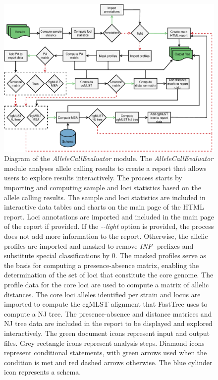 \newpage
\begin{figure}[!ht]
    \centering
    \includegraphics[angle=0,width=\textwidth]{figures/chapter 2/FigureS22.pdf}
    \caption[Diagram of the \textit{AlleleCallEvaluator} module.]{Diagram of the \textit{AlleleCallEvaluator} module. The \textit{AlleleCallEvaluator} module analyses allele calling results to create a report that allows users to explore results interactively. The process starts by importing and computing sample and loci statistics based on the allele calling results. The sample and loci statistics are included in interactive data tables and charts on the main page of the \ac{HTML} report. Loci annotations are imported and included in the main page of the report if provided. If the \textit{-{}-light} option is provided, the process does not add more information to the report. Otherwise, the allelic profiles are imported and masked to remove \textit{INF-} prefixes and substitute special classifications by 0. The masked profiles serve as the basis for computing a presence-absence matrix, enabling the determination of the set of loci that constitute the core genome. The profile data for the core loci are used to compute a matrix of allelic distances. The core loci alleles identified per strain and locus are imported to compute the \ac{cgMLST} alignment that FastTree uses to compute a \ac{NJ} tree. The presence-absence and distance matrices and \ac{NJ} tree data are included in the report to be displayed and explored interactively. The green document icons represent input and output files. Grey rectangle icons represent analysis steps. Diamond icons represent conditional statements, with green arrows used when the condition is met and red dashed arrows otherwise. The blue cylinder icon represents a schema.}
    \label{fig:chap2_figureS22}
\end{figure}

